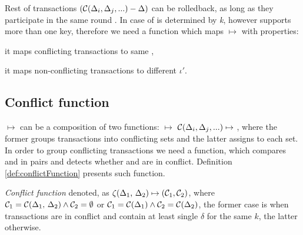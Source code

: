 

Rest of transactions $(\mathcal{C}\text{$(\Delta_{i}, \Delta_{j}, ...)$} - \text{$\Delta$})$ can be rolledback, as long as they participate in the same \paxos round \paxosRoundId. In case of \lwt \paxosRoundId is determined by \emph{k}, however \mpt supports more than one key, therefore we need a function which maps \transaction $\mapsto $ \paxosRoundId with properties: 
\begin{enumerate*}
\item it maps conflicting transactions to same \paxosRoundId,
\item it maps non-conflicting transactions to different $\iota'$.
\end{enumerate*}

\subsection{Conflict function}
\transaction $\mapsto $ \paxosRoundId can be a composition of two functions: \transaction $\mapsto $ $\mathcal{C}\text{$(\Delta_{i}, \Delta_{j}, ...)$} \mapsto$ \paxosRoundId, where the former groups transactions into conflicting sets and the latter assigns \paxosRoundId to each set.
In order to group conflicting transactions we need a function, which compares \txOne and \txTwo in pairs and detects whether
\txOne and \txTwo are in conflict. Definition \ref{def:conflictFunction} presents such function.

\begin{definition}
\label{def:conflictFunction}
\emph{Conflict function} denoted, as $\zeta (\text{$\Delta_{1}$, $\Delta_{2}$}) \mapsto ( \mathcal{C}_1, \mathcal{C}_2)$, where $\mathcal{C}_1 = \mathcal{C}(\text{$\Delta_{1}$, $\Delta_{2}$}) \wedge \mathcal{C}_2 = \emptyset $ or $\mathcal{C}_1 = \mathcal{C}(\text{$\Delta_{1}$}) \wedge \mathcal{C}_2=\mathcal{C}(\text{$\Delta_{2}$})$, the former case is when transactions are in conflict and contain at least single $\delta$ for the same $k$, the latter otherwise.
\end{definition}